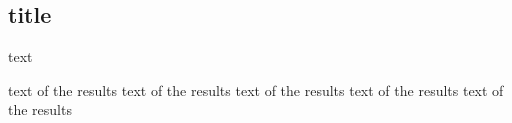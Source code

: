 \lipsum[1]

\subsection{title}

text 

\vspace*{5pt}
\begin{res}
    text of the results text of the results  text of the results text of the results text of the results 
\end{res}

\lipsum[1]



